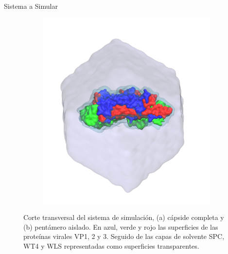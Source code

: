 \documentclass[8pt]{beamer}
\begin{document}
\begin{frame}[t]{Sistema a Simular}
\begin{figure}[ht]
\begin{subfigure}[t]{.46\textwidth}
  \includegraphics[width=1\textwidth]{Figure/TrV_Pentamer_WaterBox.png}
  \caption*{}
  \label{fig:trv_pentamer_waterbox}
\end{subfigure}
\hspace*{\fill}
\caption*{ Corte transversal del sistema de simulación, (a) cápside completa y (b) pentámero aislado. En azul, verde y rojo las superficies de las proteínas virales VP1, 2 y 3. Seguido de las capas de solvente SPC, WT4 y WLS representadas como superficies transparentes.}%
\end{figure}
\end{frame}
\end{document}
